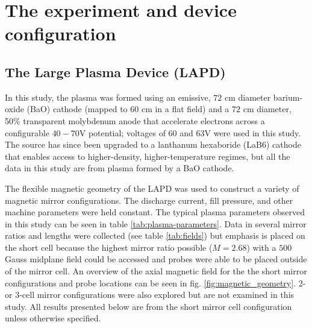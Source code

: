 \section{\label{sec:methods}The experiment and device configuration}

\subsection{\label{sec:sub_exp}The Large Plasma Device (LAPD)}

In this study, the plasma was formed using an emissive, $72$ cm  diameter barium-oxide (BaO) cathode \cite{LAPD_BaO} (mapped to 60 cm in a flat field) and a $72$ cm diameter, 50\% transparent molybdenum anode that accelerate electrons across a configurable $40-70$V potential; voltages of $60$ and $63$V were used in this study. The source has since been upgraded to a lanthanum hexaboride (LaB6) cathode \cite{LAPD_LaB6} that enables access to higher-density, higher-temperature regimes, but all the data in this study are from plasma formed by a BaO cathode. 

The flexible magnetic geometry of the LAPD was used to construct a variety of magnetic mirror configurations. The discharge current, fill pressure, and other machine parameters were held constant. The typical plasma parameters observed in this study can be seen in table \ref{tab:plasma-parameters}. 
Data in several mirror ratios and lengths were collected (see table \ref{tab:fields}) but emphasis is placed on the short cell because the highest mirror ratio possible ($M=2.68$) with a $500$ Gauss midplane field could be accessed and probes were able to be placed outside of the mirror cell. An overview of the axial magnetic field for the the short mirror configurations and probe locations can be seen in fig. \ref{fig:magnetic_geometry}. 2- or 3-cell mirror configurations were also explored but are not examined in this study. All results presented below are from the short mirror cell configuration unless otherwise specified.


